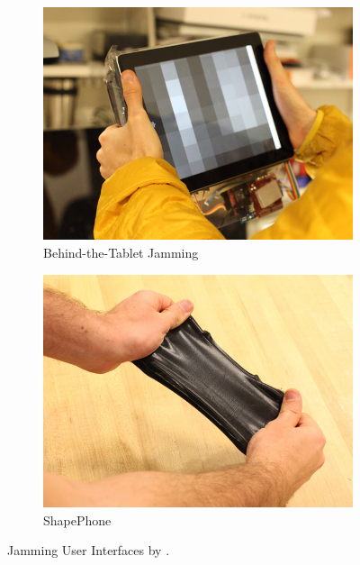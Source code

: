 \begin{figure}
        \begin{subfigure}[b]{0.45\textwidth}
                \centering
                \includegraphics[width=\textwidth]{figures/jamming/jui_behind-the-tablet}
                \caption{Behind-the-Tablet Jamming}
                \label{fig:ch:jamming:jui-tablet}
        \end{subfigure}
        \begin{subfigure}[b]{0.45\textwidth}
                \centering
                \includegraphics[width=\textwidth]{figures/jamming/jui_shapephone}
                \caption{ShapePhone}
                \label{fig:ch:jamming:jui-phone}
        \end{subfigure}
        \caption{Jamming User Interfaces by \citet{follmer2012jamming}.}
        \label{fig:ch:jamming:jui-collection}
\end{figure}

